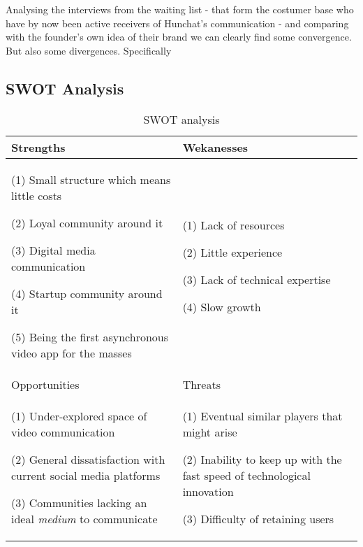 \documentclass[12pt]{article}
\begin{document}
Analysing the interviews from the waiting list - that form the costumer base who have by now been active receivers of Hunchat's communication - and comparing with the founder's own idea of their brand we can clearly find some convergence. %
But also some divergences. Specifically

\subsection{SWOT Analysis}
\begin{table}[htb]
\small
\caption{SWOT analysis}
\label{table:swot}
\centering
\begin{tabular}{ @{}P{0.48\textwidth}P{0.48\textwidth}@{} }
\hline
Strengths                             &  Wekanesses                                                                                                                                                                                                                                                                                                                                                            
\\ \hline  
(1) Small structure which means little costs \par (2) Loyal community around it \par (3) Digital media communication \par (4) Startup community around it \par 	(5) Being the first asynchronous video app for the masses & (1) Lack of resources \par (2) Little experience \par (3) Lack of technical expertise \par (4) Slow growth       \\                                                                                                                                                                                                                    \hline
Opportunities		&	Threats
\\ \hline
 (1) Under-explored space of video communication \par (2) General dissatisfaction with current social media platforms \par (3) Communities lacking an ideal \textit{medium} to communicate 		&  (1) Eventual similar players that might arise \par (2) Inability to keep up with the fast speed of technological innovation \par (3) Difficulty of retaining users 
 \\ \hline
\end{tabular}
\end{table}
\end{document}
